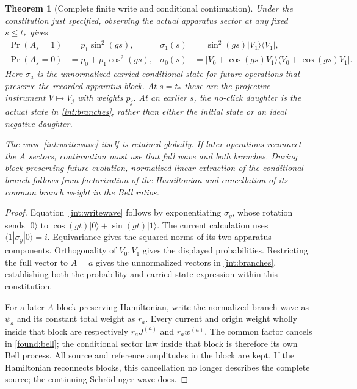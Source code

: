 \documentclass[11pt,oneside,openany]{book}
\newtheorem{theorem}{Theorem}[chapter]
\theoremstyle{definition}
\theoremstyle{remark}\newtheorem{remark}[theorem]{Remark}
\begin{document}
\begin{theorem}[Complete finite write and conditional continuation]\label{int:binary}
Under the constitution just specified, observing the actual apparatus sector at any fixed $s\le t_*$ gives
\begin{align}\label{int:branches}
 \Pr(A_s=1)&=p_1\sin^2(gs),&
 \sigma_1(s)&=\sin^2(gs)|V_1\rangle\langle V_1|,\\
 \Pr(A_s=0)&=p_0+p_1\cos^2(gs),&
 \sigma_0(s)&=|V_0+\cos(gs)V_1\rangle\langle V_0+\cos(gs)V_1|.
\end{align}
Here $\sigma_a$ is the unnormalized carried conditional state for future operations that preserve the recorded apparatus block. At $s=t_*$ these are the projective instrument $V\mapsto V_j$ with weights $p_j$. At an earlier $s$, the no-click daughter is the actual state in \eqref{int:branches}, rather than either the initial state or an ideal negative daughter.

The wave \eqref{int:writewave} itself is retained globally. If later operations reconnect the $A$ sectors, continuation must use that full wave and both branches. During block-preserving future evolution, normalized linear extraction of the conditional branch follows from factorization of the Hamiltonian and cancellation of its common branch weight in the Bell ratios.
\end{theorem}
\begin{proof}
Equation~\eqref{int:writewave} follows by exponentiating $\sigma_y$, whose rotation sends $|0\rangle$ to $\cos(gt)|0\rangle+\sin(gt)|1\rangle$. The current calculation uses $\langle1|\sigma_y|0\rangle=i$. Equivariance gives the squared norms of its two apparatus components. Orthogonality of $V_0,V_1$ gives the displayed probabilities. Restricting the full vector to $A=a$ gives the unnormalized vectors in \eqref{int:branches}, establishing both the probability and carried-state expression within this constitution.

For a later $A$-block-preserving Hamiltonian, write the normalized branch wave as $\psi_a$ and its constant total weight as $r_a$. Every current and origin weight wholly inside that block are respectively $r_a J^{(a)}$ and $r_a w^{(a)}$. The common factor cancels in \eqref{found:bell}; the conditional sector law inside that block is therefore its own Bell process. All source and reference amplitudes in the block are kept. If the Hamiltonian reconnects blocks, this cancellation no longer describes the complete source; the continuing Schr\"odinger wave does.
\end{proof}
\end{document}
